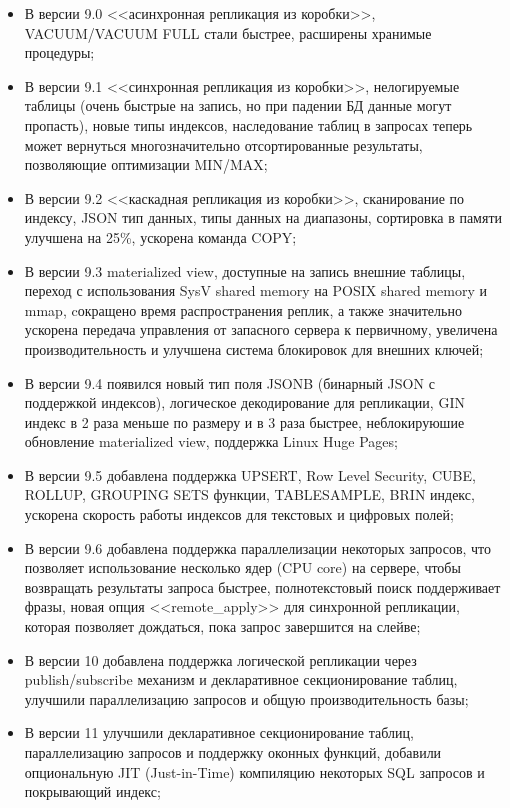 \begin{itemize}
  \item В версии 9.0 <<асинхронная репликация из коробки>>, VACUUM/VACUUM FULL стали быстрее, расширены хранимые процедуры;
  \item В версии 9.1 <<синхронная репликация из коробки>>, нелогируемые таблицы (очень быстрые на запись, но при падении БД данные могут пропасть), новые типы индексов, наследование таблиц в запросах теперь может вернуться многозначительно отсортированные результаты, позволяющие оптимизации MIN/MAX;
  \item В версии 9.2 <<каскадная репликация из коробки>>, сканирование по индексу, JSON тип данных, типы данных на диапазоны, сортировка в памяти улучшена на 25\%, ускорена команда COPY;
  \item В версии 9.3 materialized view, доступные на запись внешние таблицы, переход с использования SysV shared memory на POSIX shared memory и mmap, cокращено время распространения реплик, а также значительно ускорена передача управления от запасного сервера к первичному, увеличена производительность и улучшена система блокировок для внешних ключей;
  \item В версии 9.4 появился новый тип поля JSONB (бинарный JSON с поддержкой индексов), логическое декодирование для репликации, GIN индекс в 2 раза меньше по размеру и в 3 раза быстрее, неблокируюшие обновление materialized view, поддержка Linux Huge Pages;
  \item В версии 9.5 добавлена поддержка UPSERT, Row Level Security, CUBE, ROLLUP, GROUPING SETS функции, TABLESAMPLE, BRIN индекс, ускорена скорость работы индексов для текстовых и цифровых полей;
  \item В версии 9.6 добавлена поддержка параллелизации некоторых запросов, что позволяет использование несколько ядер (CPU core) на сервере, чтобы возвращать результаты запроса быстрее, полнотекстовый поиск поддерживает фразы, новая опция <<remote\_apply>> для синхронной репликации, которая позволяет дождаться, пока запрос завершится на слейве;
  \item В версии 10 добавлена поддержка логической репликации через publish/subscribe механизм и декларативное секционирование таблиц, улучшили параллелизацию запросов и общую производительность базы;
  \item В версии 11 улучшили декларативное секционирование таблиц, параллелизацию запросов и поддержку оконных функций, добавили опциональную JIT (Just-in-Time) компиляцию некоторых SQL запросов и покрывающий индекс;

\end{itemize}
